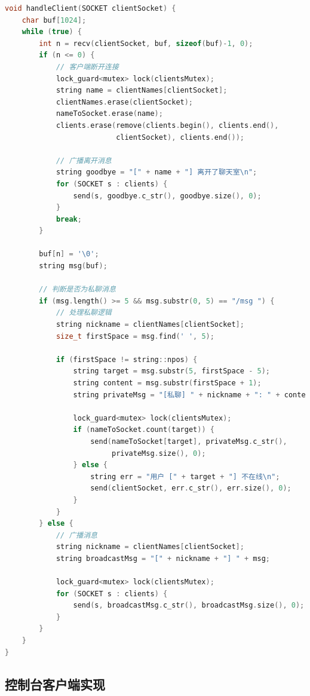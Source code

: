 \documentclass[12pt, a4paper]{article}
\begin{document}
\begin{lstlisting}[language=c++]
void handleClient(SOCKET clientSocket) {
    char buf[1024];
    while (true) {
        int n = recv(clientSocket, buf, sizeof(buf)-1, 0);
        if (n <= 0) {
            // 客户端断开连接
            lock_guard<mutex> lock(clientsMutex);
            string name = clientNames[clientSocket];
            clientNames.erase(clientSocket);
            nameToSocket.erase(name);
            clients.erase(remove(clients.begin(), clients.end(), 
                          clientSocket), clients.end());
            
            // 广播离开消息
            string goodbye = "[" + name + "] 离开了聊天室\n";
            for (SOCKET s : clients) {
                send(s, goodbye.c_str(), goodbye.size(), 0);
            }
            break;
        }
        
        buf[n] = '\0';
        string msg(buf);
        
        // 判断是否为私聊消息
        if (msg.length() >= 5 && msg.substr(0, 5) == "/msg ") {
            // 处理私聊逻辑
            string nickname = clientNames[clientSocket];
            size_t firstSpace = msg.find(' ', 5);
            
            if (firstSpace != string::npos) {
                string target = msg.substr(5, firstSpace - 5);
                string content = msg.substr(firstSpace + 1);
                string privateMsg = "[私聊] " + nickname + ": " + content;
                
                lock_guard<mutex> lock(clientsMutex);
                if (nameToSocket.count(target)) {
                    send(nameToSocket[target], privateMsg.c_str(), 
                         privateMsg.size(), 0);
                } else {
                    string err = "用户 [" + target + "] 不在线\n";
                    send(clientSocket, err.c_str(), err.size(), 0);
                }
            }
        } else {
            // 广播消息
            string nickname = clientNames[clientSocket];
            string broadcastMsg = "[" + nickname + "] " + msg;
            
            lock_guard<mutex> lock(clientsMutex);
            for (SOCKET s : clients) {
                send(s, broadcastMsg.c_str(), broadcastMsg.size(), 0);
            }
        }
    }
}
\end{lstlisting}

\subsection{控制台客户端实现}
\end{document}
